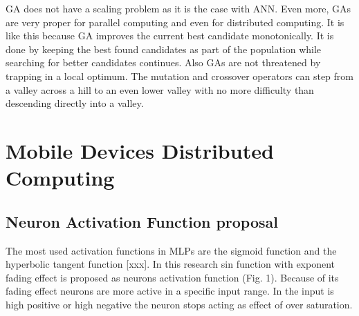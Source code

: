 \documentclass{llncs}
\begin{document}
GA does not have a scaling problem as it is the case with ANN. Even more, GAs are very proper for parallel computing and even for distributed computing. It is like this because GA improves the current best candidate monotonically. It is done by keeping the best found candidates as part of the population while searching for better candidates continues. Also GAs are not threatened by trapping in a local optimum. The mutation and crossover operators can step from a valley across a hill to an even lower valley with no more difficulty than descending directly into a valley.
%
\section{Mobile Devices Distributed Computing}
%
%
\subsection{Neuron Activation Function proposal}
%
The most used activation functions in MLPs are the sigmoid function and the hyperbolic tangent function [xxx]. In this research sin function with exponent fading effect is proposed as neurons activation function (Fig. 1). Because of its fading effect neurons are more active in a specific input range. In the input is high positive or high negative the neuron stops acting as effect of over saturation.
\end{document}
